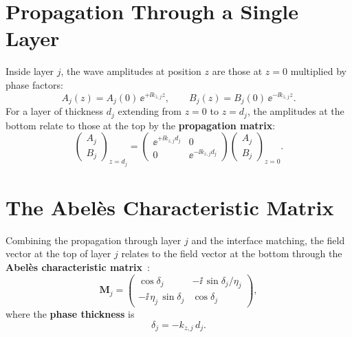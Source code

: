 \section{Propagation Through a Single Layer}

Inside layer $j$, the wave amplitudes at position $z$ are those at $z=0$
multiplied by phase factors:
\begin{equation}
  A_j(z) = A_j(0)\,\ee^{+\ii k_{z,j} z}, \qquad
  B_j(z) = B_j(0)\,\ee^{-\ii k_{z,j} z}.
  \label{eq:ch5_phase_factors}
\end{equation}
For a layer of thickness $d_j$ extending from $z=0$ to $z=d_j$, the amplitudes
at the bottom relate to those at the top by the \textbf{propagation matrix}:
\begin{equation}
  \begin{pmatrix} A_j \\ B_j \end{pmatrix}_{z=d_j}
  = \begin{pmatrix} \ee^{+\ii k_{z,j} d_j} & 0 \\ 0 & \ee^{-\ii k_{z,j} d_j}
    \end{pmatrix}
  \begin{pmatrix} A_j \\ B_j \end{pmatrix}_{z=0}.
  \label{eq:ch5_prop_matrix}
\end{equation}

\section{The Abelès Characteristic Matrix}

Combining the propagation through layer $j$ and the interface matching, the
field vector at the top of layer $j$ relates to the field vector at the bottom
through the \textbf{Abelès characteristic matrix}~\cite{macleod}:
\begin{equation}
  \bm{M}_j = \begin{pmatrix}
    \cos\delta_j & -\ii\,\sin\delta_j / \eta_j \\
    -\ii\,\eta_j\,\sin\delta_j & \cos\delta_j
  \end{pmatrix},
  \label{eq:ch5_abeles}
\end{equation}
where the \textbf{phase thickness} is
\begin{equation}
  \boxed{\delta_j = -k_{z,j}\,d_j.}
  \label{eq:ch5_delta}
\end{equation}

